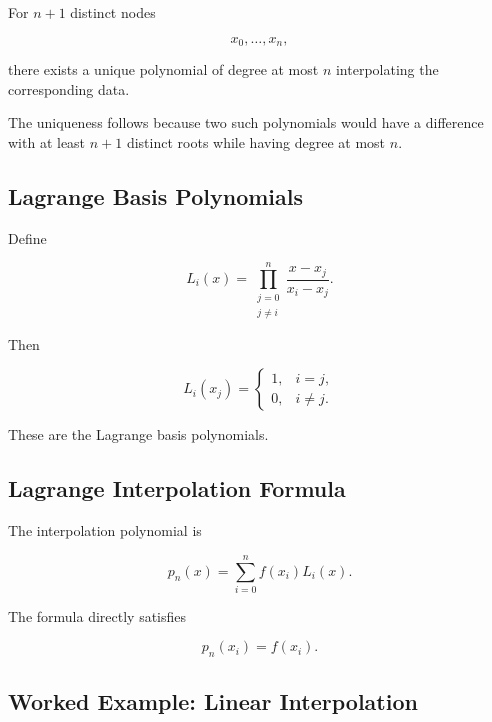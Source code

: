 For \(n+1\) distinct nodes

\[
x_0,\ldots,x_n,
\]

there exists a unique polynomial of degree at most \(n\) interpolating the
corresponding data.

The uniqueness follows because two such polynomials would have a
difference with at least \(n+1\) distinct roots while having degree at most
\(n\).

\subsection{Lagrange Basis Polynomials}
\label{subsec:lagrange-basis-polynomials}

Define

\[
\boxed{
L_i(x)
=
\prod_{\substack{j=0\\j\neq i}}^{n}
\frac{
x-x_j
}{
x_i-x_j
}.
}
\]

Then

\[
\boxed{
L_i(x_j)
=
\begin{cases}
1,
&
i=j,
\\
0,
&
i\neq j.
\end{cases}
}
\]

These are the Lagrange basis polynomials.

\subsection{Lagrange Interpolation Formula}
\label{subsec:lagrange-interpolation}

The interpolation polynomial is

\[
\boxed{
p_n(x)
=
\sum_{i=0}^{n}
f(x_i)
L_i(x).
}
\]

The formula directly satisfies

\[
p_n(x_i)=f(x_i).
\]

\subsection{Worked Example: Linear Interpolation}
\label{subsec:worked-linear-interpolation}

